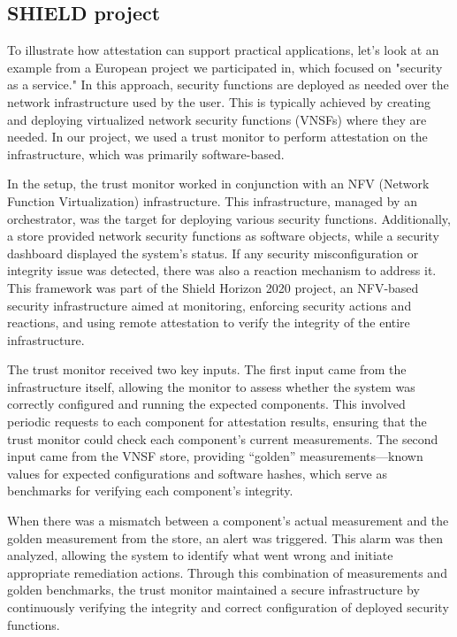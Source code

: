 \subsection{SHIELD project}
To illustrate how attestation can support practical applications,
let's look at an example from a European project we participated in,
which focused on "security as a service." In this approach, security
functions are deployed as needed over the network infrastructure used
by the user. This is typically achieved by creating and deploying
virtualized network security functions (VNSFs) where they are needed.
In our project, we used a trust monitor to perform attestation on the
infrastructure, which was primarily software-based.

In the setup, the trust monitor worked in conjunction with an NFV
(Network Function Virtualization) infrastructure. This infrastructure,
managed by an orchestrator, was the target for deploying various
security functions. Additionally, a store provided network security
functions as software objects, while a security dashboard displayed
the system's status. If any security misconfiguration or integrity
issue was detected, there was also a reaction mechanism to address it.
This framework was part of the Shield Horizon 2020 project, an
NFV-based security infrastructure aimed at monitoring, enforcing
security actions and reactions, and using remote attestation to verify
the integrity of the entire infrastructure.

The trust monitor received two key inputs. The first input came from
the infrastructure itself, allowing the monitor to assess whether the
system was correctly configured and running the expected components.
This involved periodic requests to each component for attestation
results, ensuring that the trust monitor could check each component’s
current measurements. The second input came from the VNSF store,
providing “golden” measurements—known values for expected
configurations and software hashes, which serve as benchmarks for
verifying each component's integrity.

When there was a mismatch between a component's actual measurement and
the golden measurement from the store, an alert was triggered. This
alarm was then analyzed, allowing the system to identify what went
wrong and initiate appropriate remediation actions. Through this
combination of measurements and golden benchmarks, the trust monitor
maintained a secure infrastructure by continuously verifying the
integrity and correct configuration of deployed security functions.

